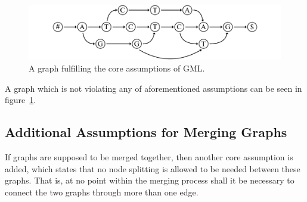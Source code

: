 \documentclass[a4paper,12pt,twoside,BCOR=10mm]{scrbook}
\begin{document}
\begin{figure}[!htb]
\centering
\includegraphics[width=\textwidth]{evo_fig_assume_all_good.pdf}
\caption[Graph fulfilling core assumptions of GML]{A graph fulfilling the core assumptions of GML.} \label{fig:evo_fig_assume_all_good}
\end{figure}

A graph which is not violating any of aforementioned assumptions can be seen in figure~\ref{fig:evo_fig_assume_all_good}.

\subsection{Additional Assumptions for Merging Graphs}

If graphs are supposed to be merged together, then another core assumption is added, 
which states that no node splitting is allowed to be needed between these graphs. 
That is, at no point within the merging process shall it be necessary to 
connect the two graphs through more than one edge.

\end{document}
